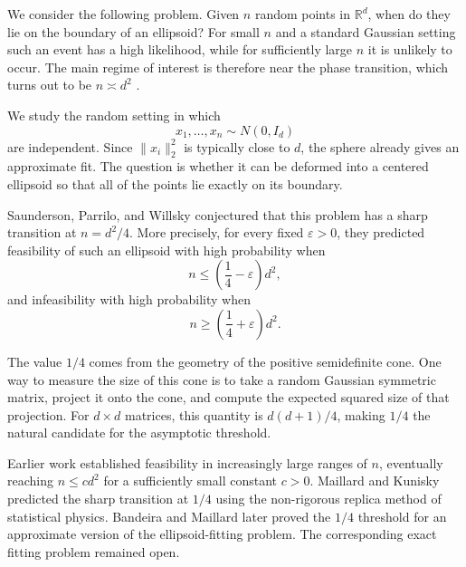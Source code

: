\documentclass[11pt]{article}
\numberwithin{equation}{section}
\theoremstyle{definition}
\theoremstyle{remark}
\newcommand{\R}{\mathbb R}
\newcommand{\1}{\boldsymbol 1}
\begin{document}
\begin{humanblock}


We consider the following problem. Given $n$ random points in $\R^d$, when do they lie on the boundary of an ellipsoid? For small $n$ and a standard Gaussian setting such an event has a high likelihood, while for sufficiently large $n$ it is unlikely to occur. The main regime of interest is therefore near the phase transition, which turns out to be $n\asymp d^2$ \cite{BandeiraMaillard2025, MaillardKunisky2024, SaundersonParriloWillsky2013}.

We study the random setting in which
\[
  x_1,\ldots,x_n\sim N(0,I_d)
\]
are independent. Since $\|x_i\|_2^2$ is typically close to $d$, the sphere already gives an approximate fit. The question is whether it can be deformed into a centered ellipsoid so that all of the points lie exactly on its boundary.

Saunderson, Parrilo, and Willsky \cite{SaundersonParriloWillsky2013} conjectured that this problem has a sharp transition at $n=d^2/4$. More precisely, for every fixed $\varepsilon>0$, they predicted feasibility of such an ellipsoid with high probability when
\[
  n\le\left(\frac14-\varepsilon\right)d^2,
\]
and infeasibility with high probability when
\[
  n\ge\left(\frac14+\varepsilon\right)d^2.
\]

The value $1/4$ comes from the geometry of the positive semidefinite cone. One way to measure the size of this cone is to take a random Gaussian symmetric matrix, project it onto the cone, and compute the expected squared size of that projection. For $d\times d$ matrices, this quantity is $d(d+1)/4$, making $1/4$ the natural candidate for the asymptotic threshold.




Earlier work established feasibility in increasingly large ranges of $n$, eventually reaching $n\le cd^2$ for a
sufficiently small constant $c>0$. Maillard and Kunisky \cite{MaillardKunisky2024} predicted the sharp transition at $1/4$ using the non-rigorous replica method of statistical physics. Bandeira and Maillard \cite{BandeiraMaillard2025} later proved the $1/4$ threshold for an approximate version of the ellipsoid-fitting problem. The corresponding exact fitting problem remained open.







\end{humanblock}
\end{document}
